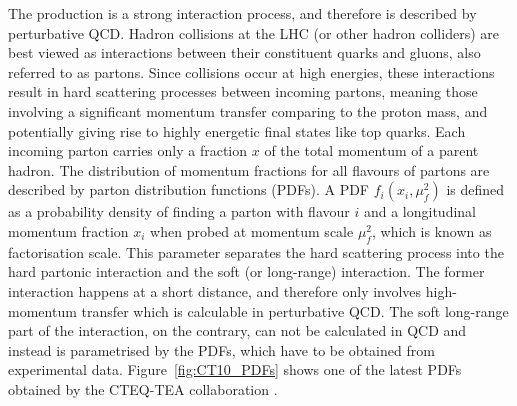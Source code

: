 

The \ttbar production is a strong interaction process, and therefore is described by perturbative QCD. Hadron collisions
at the LHC (or other hadron colliders) are best viewed as interactions between their constituent quarks and gluons, also
referred to as partons. Since collisions occur at high energies, these interactions result in hard scattering processes
between incoming partons, meaning those involving a significant momentum transfer comparing to the proton mass, and
potentially giving rise to highly energetic final states like top quarks. Each incoming parton carries only a fraction
$x$ of the total momentum of a parent hadron. The distribution of momentum fractions for all flavours of partons are
described by parton distribution functions (PDFs). A PDF $f_i(x_i,\mu_f^2)$ is defined as a probability density of
finding a parton with flavour $i$ and a longitudinal momentum fraction $x_i$ when probed at momentum scale $\mu_f^2$,
which is known as factorisation scale. This parameter separates the hard scattering process into the hard partonic
interaction and the soft (or long-range) interaction. The former interaction happens at a short distance, and therefore
only involves high-momentum transfer which is calculable in perturbative QCD. The soft long-range part of the
interaction, on the contrary, can not be calculated in QCD and instead is parametrised by the PDFs, which have to be
obtained from experimental data. Figure~\ref{fig:CT10_PDFs} shows one of the latest PDFs obtained by the CTEQ-TEA
collaboration \autocite{CT10_NNLO}.

